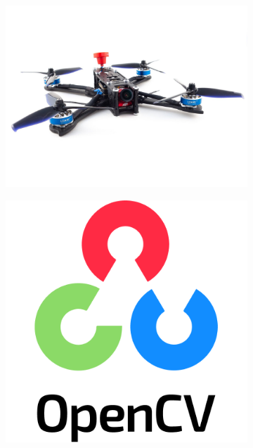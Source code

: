 \documentclass[a4paper,12pt]{article} %
\begin{document}
\begin{figure}[h]
    \centering
    \begin{subfigure}{0.4\textwidth}
        \includegraphics[width=\linewidth]{img/drone.jpg}
    \end{subfigure}
    \hfill
    \begin{subfigure}{0.2\textwidth}
        \includegraphics[width=\linewidth]{img/opencv.png}
    \end{subfigure}

\end{figure}
\end{document}
